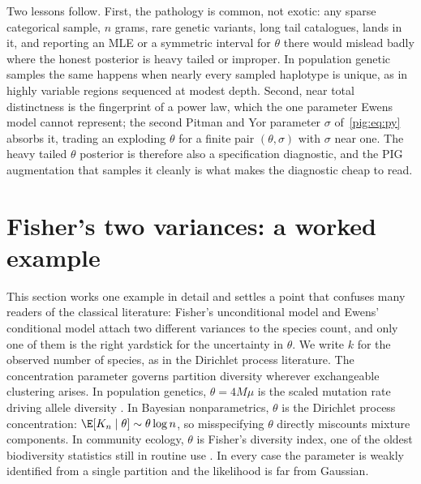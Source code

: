 Two lessons follow. First, the pathology is common, not exotic: any sparse categorical sample, $n$ grams, rare genetic variants, long tail catalogues, lands in it, and reporting an MLE or a symmetric interval for $\theta$ there would mislead badly where the honest posterior is heavy tailed or improper. In population genetic samples the same happens when nearly every sampled haplotype is unique, as in highly variable regions sequenced at modest depth. Second, near total distinctness is the fingerprint of a power law, which the one parameter Ewens model cannot represent; the second Pitman and Yor parameter $\sigma$ of~\eqref{pig:eq:py} absorbs it, trading an exploding $\theta$ for a finite pair $(\theta,\sigma)$ with $\sigma$ near one. The heavy tailed $\theta$ posterior is therefore also a specification diagnostic, and the PIG augmentation that samples it cleanly is what makes the diagnostic cheap to read.

\section{Fisher's two variances: a worked example}\label{pig:sec:twovariances}

This section works one example in detail and settles a point that confuses many readers of the classical literature: Fisher's unconditional model and Ewens' conditional model attach two different variances to the species count, and only one of them is the right yardstick for the uncertainty in $\theta$. We write $k$ for the observed number of species, as in the Dirichlet process literature. The concentration parameter governs partition diversity wherever exchangeable clustering arises. In population genetics, $\theta=4M\mu$ is the scaled mutation rate driving allele diversity \citep{pig:ewens1972}. In Bayesian nonparametrics, $\theta$ is the Dirichlet process concentration: $\E[K_n\mid\theta]\sim\theta\log n$, so misspecifying $\theta$ directly miscounts mixture components. In community ecology, $\theta$ is Fisher's diversity index, one of the oldest biodiversity statistics still in routine use \citep{pig:fisher1943}. In every case the parameter is weakly identified from a single partition and the likelihood is far from Gaussian.

